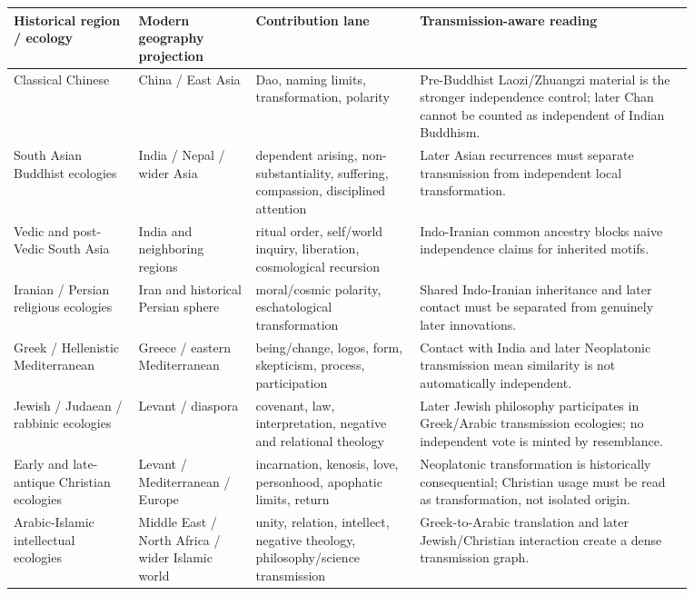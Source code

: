 \documentclass[11pt]{article}
\begin{document}
\begin{center}\small
\begin{longtable}{p{0.16\linewidth}p{0.15\linewidth}p{0.21\linewidth}p{0.35\linewidth}}
\toprule
Historical region / ecology & Modern geography projection & Contribution lane & Transmission-aware reading \\
\midrule
Classical Chinese & China / East Asia & Dao, naming limits, transformation, polarity & Pre-Buddhist Laozi/Zhuangzi material is the stronger independence control; later Chan cannot be counted as independent of Indian Buddhism.\\
South Asian Buddhist ecologies & India / Nepal / wider Asia & dependent arising, non-substantiality, suffering, compassion, disciplined attention & Later Asian recurrences must separate transmission from independent local transformation.\\
Vedic and post-Vedic South Asia & India and neighboring regions & ritual order, self/world inquiry, liberation, cosmological recursion & Indo-Iranian common ancestry blocks naive independence claims for inherited motifs.\\
Iranian / Persian religious ecologies & Iran and historical Persian sphere & moral/cosmic polarity, eschatological transformation & Shared Indo-Iranian inheritance and later contact must be separated from genuinely later innovations.\\
Greek / Hellenistic Mediterranean & Greece / eastern Mediterranean & being/change, logos, form, skepticism, process, participation & Contact with India and later Neoplatonic transmission mean similarity is not automatically independent.\\
Jewish / Judaean / rabbinic ecologies & Levant / diaspora & covenant, law, interpretation, negative and relational theology & Later Jewish philosophy participates in Greek/Arabic transmission ecologies; no independent vote is minted by resemblance.\\
Early and late-antique Christian ecologies & Levant / Mediterranean / Europe & incarnation, kenosis, love, personhood, apophatic limits, return & Neoplatonic transformation is historically consequential; Christian usage must be read as transformation, not isolated origin.\\
Arabic-Islamic intellectual ecologies & Middle East / North Africa / wider Islamic world & unity, relation, intellect, negative theology, philosophy/science transmission & Greek-to-Arabic translation and later Jewish/Christian interaction create a dense transmission graph.\\

\end{longtable}
\end{center}
\end{document}
